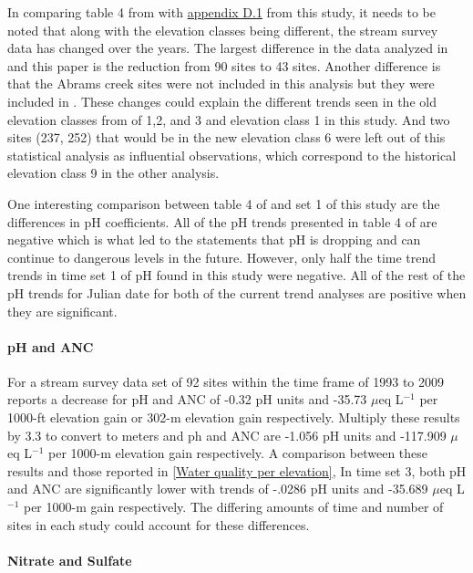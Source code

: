 In comparing table 4 from \citet{robinson2008ph} with \hyperref[app:Step-wise julian date]{appendix D.1} from this study, it needs to be noted that along with the elevation classes being different, the stream survey data has changed over the years. 
The largest difference in the data analyzed in \citet{robinson2008ph} and this paper is the reduction from 90 sites to 43 sites. 
Another difference is that the Abrams creek sites were not included in this analysis but they were included in \citet{robinson2008ph}. 
These changes could explain the different trends seen in the old elevation classes from \citet{robinson2008ph} of 1,2, and 3 and elevation class 1 in this study. 
And two sites (237, 252) that would be in the new elevation class 6 were left out of this statistical analysis as influential observations, which correspond to the historical elevation class 9 in the other analysis. 

One interesting comparison between table 4 of \citet{robinson2008ph} and set 1 of this study are the differences in pH coefficients. 
All of the pH trends presented in table 4 of \citet{robinson2008ph} are negative which is what led to the statements that pH is dropping and can continue to dangerous levels in the future. 
However, only half the time trend trends in time set 1 of pH found in this study were negative. 
All of the rest of the pH trends for Julian date for both of the current trend analyses are positive when they are significant.

\paragraph{pH and ANC}

For a stream survey data set of 92 sites within the time frame of 1993 to 2009 \citet{cai2013} reports a decrease for pH and ANC of -0.32 pH units and -35.73 $\mu$eq L$^{-1}$ per 1000-ft elevation gain or 302-m elevation gain respectively. 
Multiply these results by 3.3 to convert to meters and ph and ANC are -1.056 pH units and -117.909 $\mu$eq L$^{-1}$ per 1000-m elevation gain respectively.
A comparison between these results and those reported in \autoref{Water quality per elevation},
In time set 3,  both pH and ANC are significantly lower with trends of -.0286 pH units and -35.689 $\mu$eq L$^{-1}$  per 1000-m gain respectively.  
The differing amounts of time and number of sites in each study could account for these differences.

\paragraph{Nitrate and Sulfate}

